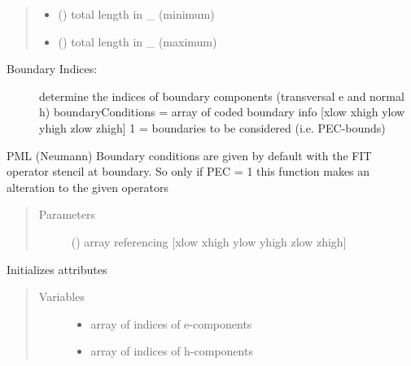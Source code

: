 \documentclass[letterpaper,10pt,english]{sphinxmanual}
\begin{document}
\begin{fulllineitems}
\begin{fulllineitems}
\begin{quote}
\begin{description}
\begin{itemize}
\item {} 
 () \textendash{} total length in \_ (minimum)

\item {} 
 () \textendash{} total length in \_ (maximum)

\end{itemize}

\end{description}\end{quote}
\begin{description}
\item[{Boundary Indices:}] \leavevmode
determine the indices of boundary components (transversal e and normal h)
boundaryConditions = array of coded boundary info {[}xlow xhigh ylow yhigh zlow zhigh{]} 
1 = boundaries to be considered (i.e. PEC-bounds)

\end{description}

PML (Neumann) Boundary conditions are given by default with the FIT operator stencil at boundary. So only if PEC = 1 this function makes an alteration to the given operators
\begin{quote}\begin{description}
\item[{Parameters}] \leavevmode
{} () \textendash{} array referencing {[}xlow xhigh ylow yhigh zlow zhigh{]}

\end{description}\end{quote}

Initializes attributes
\begin{quote}\begin{description}
\item[{Variables}] \leavevmode\begin{itemize}
\item {} 
 \textendash{} array of indices of e-components

\item {} 
 \textendash{} array of indices of h-components

\end{itemize}


\end{description}
\end{quote}
\end{fulllineitems}
\end{fulllineitems}
\end{document}
